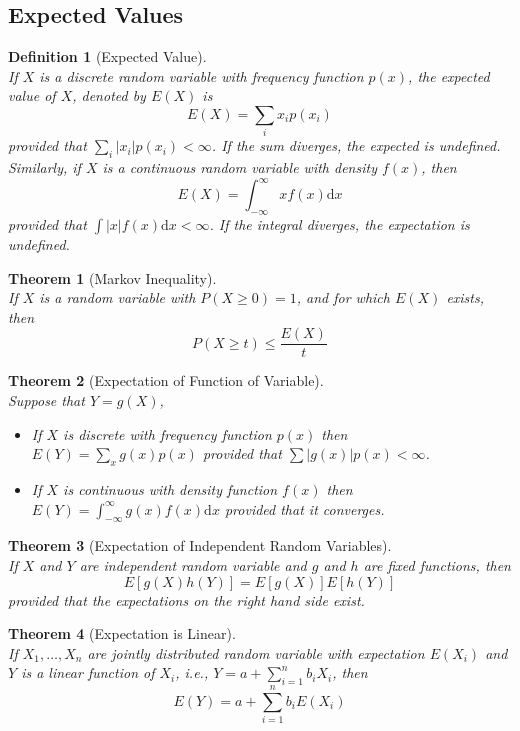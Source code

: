 \documentclass[12pt]{article}
\newcommand{\diff}{\mathrm{d}}
\newtheorem{definition}{Definition}[section]
\newtheorem{theorem}{Theorem}[section]
\theoremstyle{definition}
\begin{document}
\subsection{Expected Values}
\begin{definition}[Expected Value]
\hfill\\\normalfont If $X$ is a discrete random variable with frequency function $p(x)$, the expected value of $X$, denoted by $E(X)$ is
\[
E(X) = \sum_i x_ip(x_i)
\]
provided that $\sum_i |x_i|p(x_i)<\infty$. If the sum diverges, the expected is undefined.\\
Similarly, if $X$ is a continuous random variable with density $f(x)$, then
\[
E(X) = \int_{-\infty}^\infty xf(x)\diff x
\]
provided that $\int |x|f(x)\diff x<\infty$. If the integral diverges, the expectation is undefined.
\end{definition}
\begin{theorem}[Markov Inequality]
\hfill\\\normalfont If $X$ is a random variable with $P(X\geq 0)=1$, and for which $E(X)$ exists, then 
\[
P(X\geq t) \leq \frac{E(X)}{t}
\]
\end{theorem}
\begin{theorem}[Expectation of Function of Variable]
\hfill\\\normalfont Suppose that $Y=g(X)$,
\begin{itemize}
  \item If $X$ is discrete with frequency function $p(x)$ then $E(Y) = \sum_{x}g(x)p(x)$ provided that $\sum|g(x)|p(x)<\infty$.
  \item If $X$ is continuous with density function $f(x)$ then $E(Y) = \int_{-\infty}^\infty g(x)f(x)\diff x$  provided that it converges.
\end{itemize}
\end{theorem}
\begin{theorem}[Expectation of Independent Random Variables]
\hfill\\\normalfont If $X$ and $Y$ are independent random variable and $g$ and $h$ are fixed functions, then 
\[
E[g(X)h(Y)] = E[g(X)]E[h(Y)]
\]
provided that the expectations on the right hand side exist.
\end{theorem}
\begin{theorem}[Expectation is Linear]
\hfill\\\normalfont If $X_1,\ldots,X_n$ are jointly distributed random variable with expectation $E(X_i)$ and $Y$ is a linear function of $X_i$, i.e., $Y=a+\sum_{i=1}^n b_iX_i$, then
\[
E(Y) = a+\sum_{i=1}^n b_iE(X_i)
\]
\end{theorem}
\end{document}
